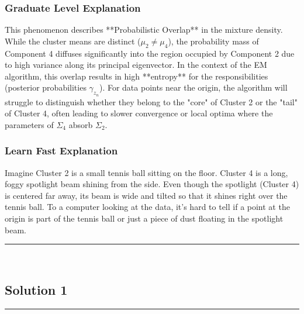 \documentclass{article}
\begin{document}
\subsubsection*{Graduate Level Explanation}
This phenomenon describes **Probabilistic Overlap** in the mixture density. While the cluster means are distinct ($\mu_2 \neq \mu_4$), the probability mass of Component 4 diffuses significantly into the region occupied by Component 2 due to high variance along its principal eigenvector. 
In the context of the EM algorithm, this overlap results in high **entropy** for the responsibilities (posterior probabilities $\gamma_{z_n}$). For data points near the origin, the algorithm will struggle to distinguish whether they belong to the "core" of Cluster 2 or the "tail" of Cluster 4, often leading to slower convergence or local optima where the parameters of $\Sigma_4$ absorb $\Sigma_2$.

\subsubsection*{Learn Fast Explanation}
Imagine Cluster 2 is a small tennis ball sitting on the floor. Cluster 4 is a long, foggy spotlight beam shining from the side. Even though the spotlight (Cluster 4) is centered far away, its beam is wide and tilted so that it shines right over the tennis ball.
To a computer looking at the data, it's hard to tell if a point at the origin is part of the tennis ball or just a piece of dust floating in the spotlight beam.

\noindent\rule{\textwidth}{0.4pt}\\

\newpage

\subsection*{Solution 1}
\noindent\rule{\textwidth}{0.4pt}\\
\end{document}
